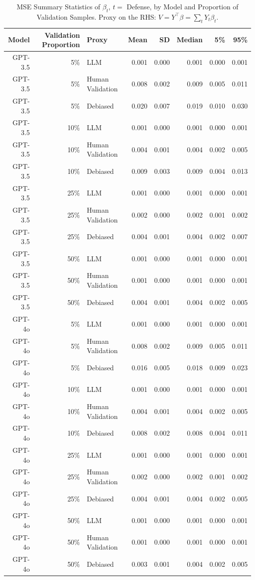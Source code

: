 \begin{table}

\caption{MSE Summary Statistics of $\beta_{t}$, $t=$ Defense, by Model and Proportion of Validation Samples.
      Proxy on the RHS: $V = Y^\top \beta = \sum_{t} Y_t \beta_t$.}
\centering
\begin{tabular}[t]{rrlrrrrr}
\toprule
Model & Validation Proportion & Proxy & Mean & SD & Median & 5\% & 95\%\\
\midrule
GPT-3.5 & 5\% & LLM & 0.001 & 0.000 & 0.001 & 0.000 & 0.001\\
GPT-3.5 & 5\% & Human Validation & 0.008 & 0.002 & 0.009 & 0.005 & 0.011\\
GPT-3.5 & 5\% & Debiased & 0.020 & 0.007 & 0.019 & 0.010 & 0.030\\
GPT-3.5 & 10\% & LLM & 0.001 & 0.000 & 0.001 & 0.000 & 0.001\\
GPT-3.5 & 10\% & Human Validation & 0.004 & 0.001 & 0.004 & 0.002 & 0.005\\
GPT-3.5 & 10\% & Debiased & 0.009 & 0.003 & 0.009 & 0.004 & 0.013\\
GPT-3.5 & 25\% & LLM & 0.001 & 0.000 & 0.001 & 0.000 & 0.001\\
GPT-3.5 & 25\% & Human Validation & 0.002 & 0.000 & 0.002 & 0.001 & 0.002\\
GPT-3.5 & 25\% & Debiased & 0.004 & 0.001 & 0.004 & 0.002 & 0.007\\
GPT-3.5 & 50\% & LLM & 0.001 & 0.000 & 0.001 & 0.000 & 0.001\\
GPT-3.5 & 50\% & Human Validation & 0.001 & 0.000 & 0.001 & 0.000 & 0.001\\
GPT-3.5 & 50\% & Debiased & 0.004 & 0.001 & 0.004 & 0.002 & 0.005\\
GPT-4o & 5\% & LLM & 0.001 & 0.000 & 0.001 & 0.000 & 0.001\\
GPT-4o & 5\% & Human Validation & 0.008 & 0.002 & 0.009 & 0.005 & 0.011\\
GPT-4o & 5\% & Debiased & 0.016 & 0.005 & 0.018 & 0.009 & 0.023\\
GPT-4o & 10\% & LLM & 0.001 & 0.000 & 0.001 & 0.000 & 0.001\\
GPT-4o & 10\% & Human Validation & 0.004 & 0.001 & 0.004 & 0.002 & 0.005\\
GPT-4o & 10\% & Debiased & 0.008 & 0.002 & 0.008 & 0.004 & 0.011\\
GPT-4o & 25\% & LLM & 0.001 & 0.000 & 0.001 & 0.000 & 0.001\\
GPT-4o & 25\% & Human Validation & 0.002 & 0.000 & 0.002 & 0.001 & 0.002\\
GPT-4o & 25\% & Debiased & 0.004 & 0.001 & 0.004 & 0.002 & 0.005\\
GPT-4o & 50\% & LLM & 0.001 & 0.000 & 0.001 & 0.000 & 0.001\\
GPT-4o & 50\% & Human Validation & 0.001 & 0.000 & 0.001 & 0.000 & 0.001\\
GPT-4o & 50\% & Debiased & 0.003 & 0.001 & 0.004 & 0.002 & 0.005\\
\bottomrule
\end{tabular}
\end{table}
